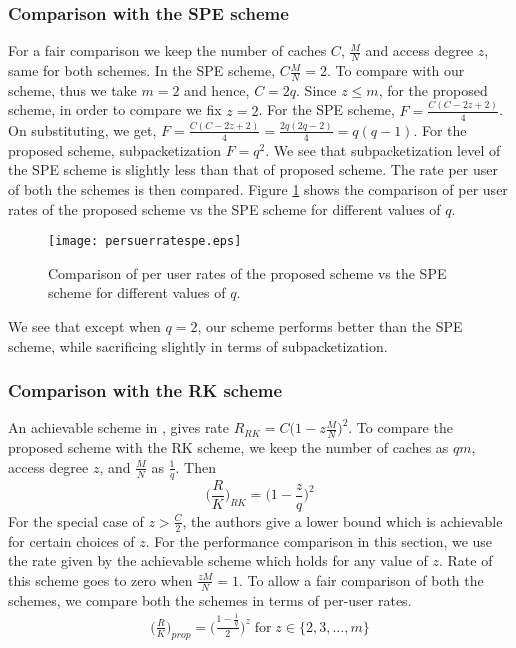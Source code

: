 \documentclass[conference]{IEEEtran}
\begin{document}
\subsubsection{Comparison with the SPE scheme \cite{SPE}}
		For a fair comparison we keep the number of caches $C$, $\frac{M}{N}$ and access degree $z$, same for both schemes. In the SPE scheme, $C\frac{M}{N} = 2$.
		To compare with our scheme, thus we take $m = 2$ and hence, $C = 2q$.
		Since $z \leq m$, for the proposed scheme, in order to compare we fix $z = 2$.
		For the SPE scheme,
		$F =\frac{C(C - 2z + 2)}{4}$. On substituting,
		we get, $F =\frac{C(C - 2z + 2)}{4} = \frac{2q(2q - 2)}{4} = q(q-1)$. For the proposed scheme, subpacketization $F = q^2$.
		We see that subpacketization level of the SPE scheme is slightly less than that of proposed scheme.
		The rate per user of both the schemes is then compared. Figure \ref{fig2} shows the comparison of per user rates of the proposed scheme vs the SPE scheme for different values of $q$.\\	
        \begin{figure}
        	\texttt{[image: persuerratespe.eps]}
        	\begin{center}
        		\caption {Comparison of per user rates of the proposed scheme vs the SPE scheme for different values of $q$.}
        		\label{fig2}
        	\end{center}
        \end{figure} 
          We see that except when $q = 2$, our scheme performs better than the SPE scheme, while sacrificing slightly in terms of subpacketization.
\subsubsection{Comparison with the RK scheme \cite{RaK3}}
		An achievable scheme in \cite{RaK3}, gives rate $R_{RK} = C \big(1 - z \frac{M}{N}\big)^2$. To compare the proposed scheme with the RK scheme, we keep the number of caches as $qm$, access degree $z$, and $\frac{M}{N}$ as $\frac{1}{q}$.
		Then $$\Big(\frac{R}{K}\Big)_{RK} =  \Big(1 -  \frac{z}{q}\Big)^2$$ For the special case of $z > \frac{C}{2}$, the authors give a lower bound which is achievable for certain choices of $z$. 
		For the performance comparison in this section, we use the rate given by the achievable scheme which holds for any value of $z$.
		Rate of this scheme goes to zero when $\frac{zM}{N} = 1$.
		To allow a fair comparison of both the schemes, we compare both the schemes in terms of per-user rates.
		\begin{align*}
		\Big(\frac{R}{K}\Big)_{prop} = \Big({\frac{1 - \frac{1}{q}}{2}}\Big)^z \;\text{for}\; z \in \{2,3,\dots,m\}
		\end{align*}
		
\end{document}
